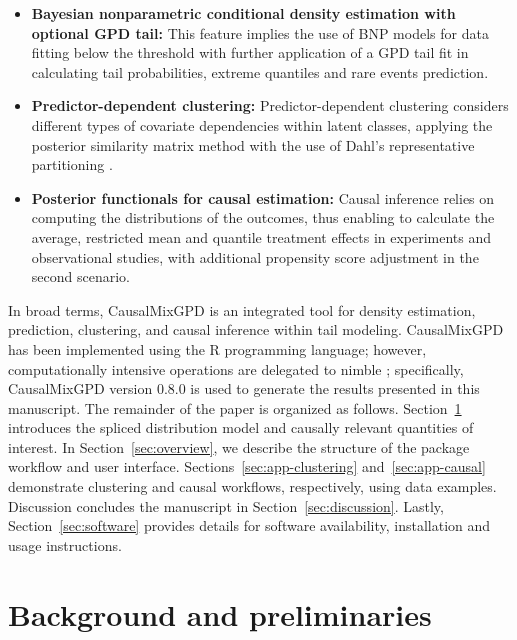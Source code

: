 \documentclass[preprint,12pt,authoryear]{elsarticle}
\newcommand{\pkg}[1]{\textsf{#1}}
\newcommand{\proglang}[1]{\textsf{#1}}
\begin{document}
\begin{itemize}
  \item[(i)] \textbf{Bayesian nonparametric conditional density estimation with optional GPD tail:} This feature implies the use of BNP models for data fitting below the threshold with further application of a GPD tail fit in calculating tail probabilities, extreme quantiles and rare events prediction.

  \item[(ii)] \textbf{Predictor-dependent clustering:} Predictor-dependent clustering considers different types of covariate dependencies within latent classes, applying the posterior similarity matrix method with the use of Dahl's representative partitioning \citep{Binder1978,Dahl2006}.

  \item[(iii)] \textbf{Posterior functionals for causal estimation:} Causal inference relies on computing the distributions of the outcomes, thus enabling to calculate the average, restricted mean and quantile treatment effects in experiments and observational studies, with additional propensity score adjustment in the second scenario.
\end{itemize}

In broad terms, \pkg{CausalMixGPD} is an integrated tool for density
estimation, prediction, clustering, and causal inference within tail modeling.
\pkg{CausalMixGPD} has been implemented using the \proglang{R} programming
language; however, computationally intensive operations are delegated to
\pkg{nimble} \citep{nimble_method,nimble_pkg}; specifically, \pkg{CausalMixGPD} version
0.8.0 is used to generate the results presented in this manuscript.
The remainder of the paper is organized as follows.
Section~\ref{sec:prelim} introduces the spliced distribution model
and causally relevant quantities of interest.
In Section~\ref{sec:overview}, we describe the structure of the package
workflow and user interface.
Sections~\ref{sec:app-clustering} and~\ref{sec:app-causal} demonstrate
clustering and causal workflows, respectively, using data examples.
Discussion concludes the manuscript in Section~\ref{sec:discussion}.
Lastly, Section~\ref{sec:software}  provides details for
software availability, installation and usage instructions.

\section{Background and preliminaries}
\label{sec:prelim}
\end{document}
